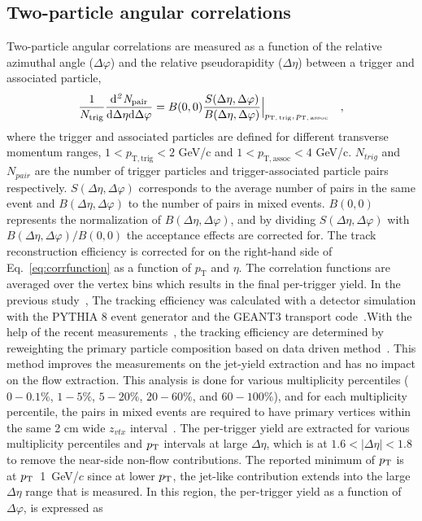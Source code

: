 \subsection{Two-particle angular correlations}
Two-particle angular correlations are measured as a function of the relative azimuthal angle ($\Delta\varphi$) and the relative pseudorapidity ($\Delta\eta$) between a trigger and associated particle,
\begin{eqnarray}
\frac{1}{N_{\rm{trig}}} \frac{ \rm{d}\it{}^{2} N_{\rm{pair}} }{ \rm{d} \Delta\eta \rm{d}\Delta\varphi} = B(0, 0)\frac{S(\Delta\eta, \Delta\varphi)}{B(\Delta\eta, \Delta\varphi)}  \Big\lvert_{p_\mathrm{T,\,trig},\,p_\mathrm{T,\,assoc}}\quad , 
\label{eq:corrfunction}
\end{eqnarray}
where the trigger and associated particles are defined for different transverse momentum ranges, $1<p_\mathrm{T,trig}<2$ GeV/c and $1<p_\mathrm{T,assoc}<4$ GeV/c. $N_{trig}$ and $N_{pair}$ are the number of trigger particles and trigger-associated particle pairs respectively. $S(\Delta\eta, \Delta\varphi)$ corresponds to the average number of pairs in the same event and $B(\Delta\eta, \Delta\varphi)$ to the number of pairs in mixed events. $B (0,0)$ represents the normalization of $B(\Delta\eta, \Delta\varphi)$, and by dividing $S(\Delta\eta, \Delta\varphi)$ with $B(\Delta\eta, \Delta\varphi)/B (0,0)$ the acceptance effects are corrected for. The track reconstruction efficiency is corrected for on the right-hand side of Eq.~\ref{eq:corrfunction} as a function of $p_\mathrm{T}$ and $\eta$. The correlation functions are averaged over the vertex bins which results in the final per-trigger yield.
In the previous study~\cite{ALICE:2021nir}, The tracking efficiency was calculated with a detector simulation with the PYTHIA 8 event generator and the GEANT3 transport code~\cite{Brun:1994aa}.With the help of the recent measurements~\cite{}, the tracking efficiency are determined by reweighting the primary particle composition based on data driven method~\cite{ALICE:2018vuu}. This method improves the measurements on the jet-yield extraction and has no impact on the flow extraction.
This analysis is done for various multiplicity percentiles ($0-0.1\%$, $1-5\%$, $5-20\%$, $20-60\%$, and $60-100\%$), and for each multiplicity percentile, the pairs in mixed events are required to have primary vertices within the same 2 cm wide $z_{vtx}$ interval~\cite{KOPYLOV1974472:evtmixing,Adam:2016tsv}. 
The per-trigger yield are extracted for various multiplicity percentiles and $p_\mathrm{T}$ intervals at large $\Delta\eta$, which is at $1.6<|\Delta\eta|<1.8$ to remove the near-side non-flow contributions. The reported minimum of $p_\mathrm{T}$  is at $p_\mathrm{T}$~1~GeV/$c$ since at lower $p_\mathrm{T}$, the jet-like contribution extends into the large $\Delta\eta$ range that is measured. In this region, the per-trigger yield as a function of $\Delta\varphi$, is expressed as

